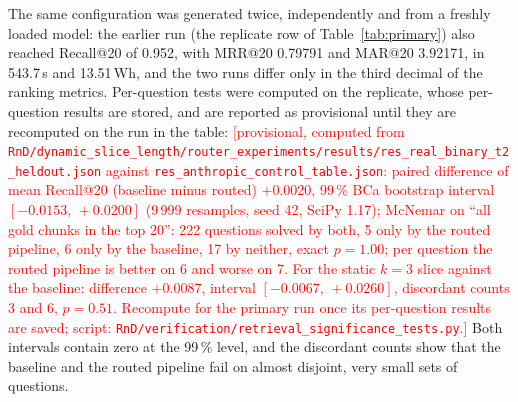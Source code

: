 \documentclass[pdflatex,sn-mathphys-num]{sn-jnl}
\makeatletter
\newcommand{\todo}[1]{\textcolor{red}{#1}}
\newcommand{\Rec}[1]{Recall@#1}
\newcommand{\MRR}[1]{MRR@#1}
\newcommand{\MAR}[1]{MAR@#1}
\theoremstyle{thmstyleone}%
\theoremstyle{thmstylethree}%
\makeatother
\begin{document}
The same configuration was generated twice, independently and from a freshly loaded model: the earlier run (the replicate row of Table~\ref{tab:primary}) also reached \Rec{20} of 0.952, with \MRR{20} 0.79791 and \MAR{20} 3.92171, in 543.7\,s and 13.51\,Wh, and the two runs differ only in the third decimal of the ranking metrics. Per-question tests were computed on the replicate, whose per-question results are stored, and are reported as provisional until they are recomputed on the run in the table: \todo{[provisional, computed from \texttt{RnD/dynamic\_slice\_length/router\_experiments/results/res\_real\_binary\_t2\_heldout.json} against \texttt{res\_anthropic\_control\_table.json}: paired difference of mean \Rec{20} (baseline minus routed) $+0.0020$, 99\,\% BCa bootstrap interval $[-0.0153,\,+0.0200]$ (9\,999 resamples, seed 42, SciPy 1.17); McNemar on ``all gold chunks in the top 20'': 222 questions solved by both, 5 only by the routed pipeline, 6 only by the baseline, 17 by neither, exact $p=1.00$; per question the routed pipeline is better on 6 and worse on 7. For the static $k=3$ slice against the baseline: difference $+0.0087$, interval $[-0.0067,\,+0.0260]$, discordant counts 3 and 6, $p=0.51$. Recompute for the primary run once its per-question results are saved; script: \texttt{RnD/verification/retrieval\_significance\_tests.py}.]} Both intervals contain zero at the 99\,\% level, and the discordant counts show that the baseline and the routed pipeline fail on almost disjoint, very small sets of questions.
\end{document}
